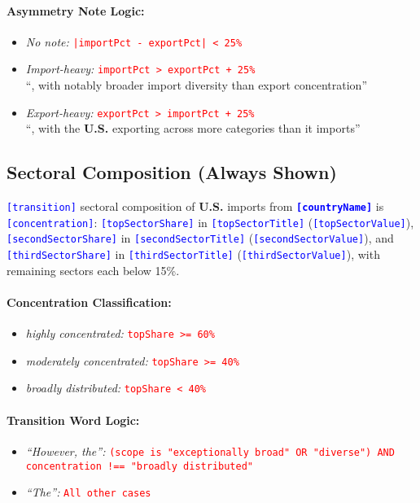 \documentclass[12pt]{article}
\newcommand{\var}[1]{\textcolor{blue}{\texttt{[#1]}}}
\newcommand{\bold}[1]{\textbf{#1}}
\newcommand{\cond}[1]{\textcolor{red}{\texttt{#1}}}
\begin{document}
\paragraph{Asymmetry Note Logic:}
\begin{itemize}[noitemsep]
\item \textit{No note:} \cond{|importPct - exportPct| < 25\%}
\item \textit{Import-heavy:} \cond{importPct > exportPct + 25\%}\\
``, with notably broader import diversity than export concentration''
\item \textit{Export-heavy:} \cond{exportPct > importPct + 25\%}\\
``, with the \bold{U.S.} exporting across more categories than it imports''
\end{itemize}

\subsection{Sectoral Composition (Always Shown)}
\var{transition} sectoral composition of \bold{U.S.} imports from \bold{\var{countryName}} is \var{concentration}: \var{topSectorShare} in \var{topSectorTitle} (\var{topSectorValue}), \var{secondSectorShare} in \var{secondSectorTitle} (\var{secondSectorValue}), and \var{thirdSectorShare} in \var{thirdSectorTitle} (\var{thirdSectorValue}), with remaining sectors each below 15\%.

\paragraph{Concentration Classification:}
\begin{itemize}[noitemsep]
\item \textit{highly concentrated:} \cond{topShare >= 60\%}
\item \textit{moderately concentrated:} \cond{topShare >= 40\%}
\item \textit{broadly distributed:} \cond{topShare < 40\%}
\end{itemize}

\paragraph{Transition Word Logic:}
\begin{itemize}[noitemsep]
\item \textit{``However, the'':} \cond{(scope is "exceptionally broad" OR "diverse") AND concentration !== "broadly distributed"}
\item \textit{``The'':} \cond{All other cases}
\end{itemize}
\end{document}
